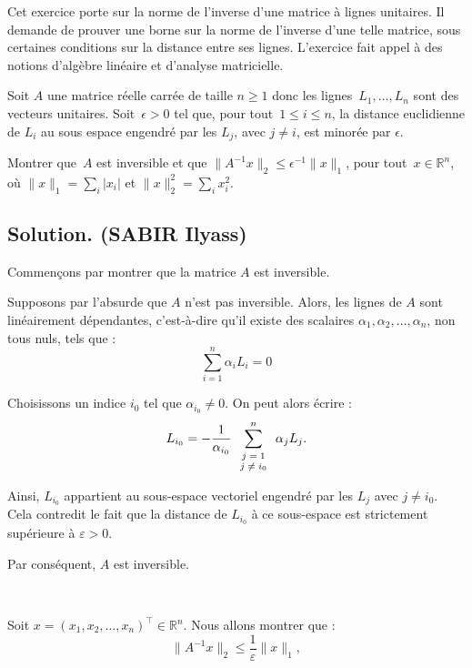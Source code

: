 Cet exercice porte sur la norme de l'inverse d'une matrice {\`a} lignes
unitaires. Il demande de prouver une borne sur la norme de l'inverse d'une
telle matrice, sous certaines conditions sur la distance entre ses lignes.
L'exercice fait appel {\`a} des notions d'alg{\`e}bre lin{\'e}aire et
d'analyse matricielle.
\begin{exercise}
Soit $A$ une matrice r{\'e}elle carr{\'e}e de taille $n \geq 1$ donc les
lignes~$L_1, \ldots, L_n$ sont des vecteurs unitaires. Soit~$\epsilon > 0$ tel
que, pour tout~$1 \leq i \leq n$, la distance euclidienne de $L_i$ au sous
espace engendr{\'e} par les $L_j$, avec $j \neq i$, est minor{\'e}e par
$\epsilon$.

Montrer que~$A$ est inversible et que $\|A^{- 1} x\|_2 \leq \epsilon^{- 1}
\|x\|_1$, pour tout~$x \in \mathbb{R}^n$, o{\`u} $\|x\|_1 = \sum_i |x_i |$ et
$\|x\|_2^2 = \sum_i x_i^2$.
\end{exercise}

\subsection*{Solution. (SABIR Ilyass)}

Commen{\c c}ons par montrer que la matrice $A$ est inversible.

Supposons par l'absurde que $A$ n'est pas inversible. Alors, les lignes de $A$
sont lin{\'e}airement d{\'e}pendantes, c'est-{\`a}-dire qu'il existe des
scalaires $\alpha_1, \alpha_2, \ldots, \alpha_n$, non tous nuls, tels que :
\[ \sum_{i = 1}^n \alpha_i L_i = 0 \]


Choisissons un indice $i_0$ tel que $\alpha_{i_0} \neq 0$. On peut alors
{\'e}crire :
\[ L_{i_0} = - \frac{1}{\alpha_{i_0}}  \sum_{\text{\scriptsize{$\begin{array}{c}
     j = 1\\
     j \neq i_0
   \end{array}$}}}^n \alpha_j L_j . \]


Ainsi, $L_{i_0}$ appartient au sous-espace vectoriel engendr{\'e} par les
$L_j$ avec $j \neq i_0$. Cela contredit le fait que la distance de $L_{i_0}$
{\`a} ce sous-espace est strictement sup{\'e}rieure {\`a} $\varepsilon > 0$.

Par cons{\'e}quent, $A$ est inversible.

\

Soit $x = (x_1, x_2, \ldots, x_n)^{\top} \in \mathbb{R}^n$. Nous allons
montrer que :
\[ \|A^{- 1} x\|_2 \leq \frac{1}{\varepsilon} \|x\|_1, \]


